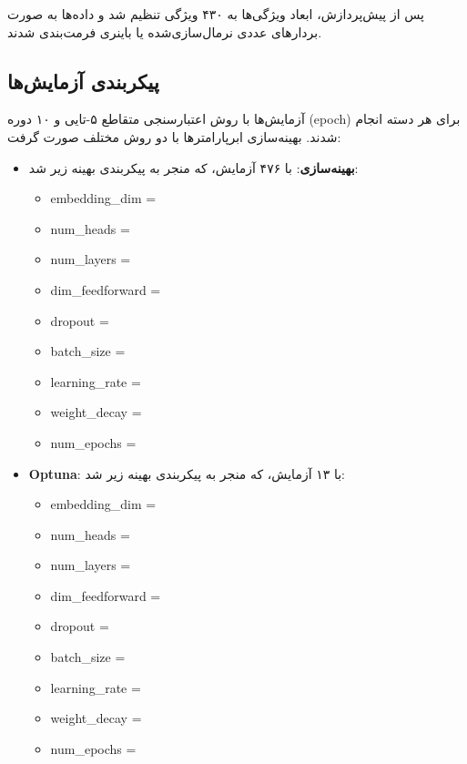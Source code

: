پس از پیش‌پردازش، ابعاد ویژگی‌ها به ۴۳۰ ویژگی تنظیم شد و داده‌ها به صورت بردارهای عددی نرمال‌سازی‌شده یا باینری فرمت‌بندی شدند.

\subsection{پیکربندی آزمایش‌ها}
آزمایش‌ها با روش اعتبارسنجی متقاطع ۵-تایی و ۱۰ دوره (epoch) برای هر دسته انجام شدند. بهینه‌سازی ابرپارامترها با دو روش مختلف صورت گرفت:

\begin{itemize}
    \item \textbf{بهینه‌سازی}: با ۴۷۶ آزمایش، که منجر به پیکربندی بهینه زیر شد:
    \begin{itemize}
        \item embedding\_dim = 
        \item num\_heads = 
        \item num\_layers = 
        \item dim\_feedforward = 
        \item dropout = 
        \item batch\_size = 
        \item learning\_rate = 
        \item weight\_decay = 
        \item num\_epochs = 
    \end{itemize}
    
    \item \textbf{Optuna}: با ۱۳ آزمایش، که منجر به پیکربندی بهینه زیر شد:
    \begin{itemize}
        \item embedding\_dim = 
        \item num\_heads = 
        \item num\_layers = 
        \item dim\_feedforward = 
        \item dropout = 
        \item batch\_size = 
        \item learning\_rate = 
        \item weight\_decay = 
        \item num\_epochs = 
    \end{itemize}
\end{itemize}

